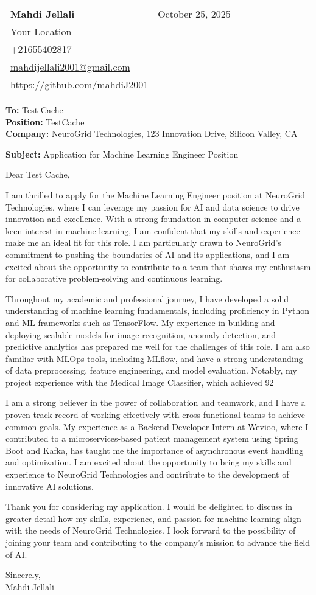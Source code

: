 \documentclass[letterpaper,11pt]{article}
\makeatletter
\newcommand{\letterHeading}[5]{
    \begin{tabular*}{\textwidth}{l@{\extracolsep{\fill}}r}
    \textbf{\Large #1} & #5 \\  %
    #2 & \\
    #3 & \\
    #4 & \\
    \end{tabular*}
    \vspace{15pt}
}
\newcommand{\letterRecipient}[3]{
    \textbf{\large To:} #1 \\
    \textbf{\large Position:} #2 \\
    \textbf{\large Company:} #3 \\
    \vspace{12pt}
}
\newcommand{\letterSubject}[1]{
    \textbf{\large Subject:} #1 \\
    \vspace{15pt}
}
\makeatother
\begin{document}
    \letterHeading
    {Mahdi Jellali}
    {Your Location}
    {+21655402817 \\ \href{mailto:mahdijellali2001@gmail.com}{mahdijellali2001@gmail.com}}
    {https://github.com/mahdiJ2001}
    {October 25, 2025}

    \letterRecipient
    {Test Cache}
    {TestCache}
    {NeuroGrid Technologies, 123 Innovation Drive, Silicon Valley, CA}

    \letterSubject{Application for Machine Learning Engineer Position}

    Dear Test Cache,

    I am thrilled to apply for the Machine Learning Engineer position at NeuroGrid Technologies, where I can leverage my passion for AI and data science to drive innovation and excellence. With a strong foundation in computer science and a keen interest in machine learning, I am confident that my skills and experience make me an ideal fit for this role. I am particularly drawn to NeuroGrid's commitment to pushing the boundaries of AI and its applications, and I am excited about the opportunity to contribute to a team that shares my enthusiasm for collaborative problem-solving and continuous learning.

    Throughout my academic and professional journey, I have developed a solid understanding of machine learning fundamentals, including proficiency in Python and ML frameworks such as TensorFlow. My experience in building and deploying scalable models for image recognition, anomaly detection, and predictive analytics has prepared me well for the challenges of this role. I am also familiar with MLOps tools, including MLflow, and have a strong understanding of data preprocessing, feature engineering, and model evaluation. Notably, my project experience with the Medical Image Classifier, which achieved 92%

    I am a strong believer in the power of collaboration and teamwork, and I have a proven track record of working effectively with cross-functional teams to achieve common goals. My experience as a Backend Developer Intern at Wevioo, where I contributed to a microservices-based patient management system using Spring Boot and Kafka, has taught me the importance of asynchronous event handling and optimization. I am excited about the opportunity to bring my skills and experience to NeuroGrid Technologies and contribute to the development of innovative AI solutions.

    Thank you for considering my application. I would be delighted to discuss in greater detail how my skills, experience, and passion for machine learning align with the needs of NeuroGrid Technologies. I look forward to the possibility of joining your team and contributing to the company's mission to advance the field of AI.

    Sincerely,\\[12pt]

    Mahdi Jellali
\end{document}
